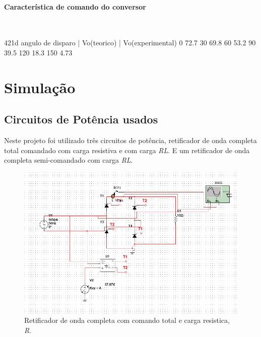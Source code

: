 \documentclass[a4paper,11pt]{article}
\numberwithin{equation}{section}
\begin{document}
\paragraph{Característica de comando do conversor} \mbox{}\

421d
angulo de disparo   |   Vo(teorico)   |   Vo(experimental)
0					  72.7
30					  69.8
60 					  53.2
90                                        39.5
120                                       18.3
150					  4.73






\pagebreak
\section{Simulação}
\subsection{Circuitos de Potência usados}
Neste projeto foi utilizado três circuitos de potência, retificador de onda completa total comandado com carga resistiva e com carga \textit{RL}. E um retificador de onda completa semi-comandado com carga \textit{RL}. 

\begin{figure}[h]
	\centering
	\includegraphics[keepaspectratio=true, scale=0.5]{img/circuito1}
	\caption{Retificador de onda completa com comando total e carga resistica, \textit{R}.}
	\label{fig:circuit_3}
	\vspace{-0.8em}
\end{figure}
\end{document}
